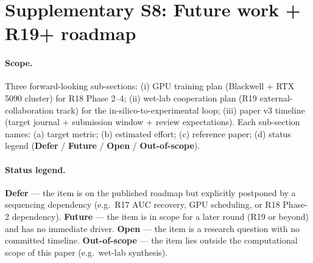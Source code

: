 %

\section*{Supplementary S8: Future work + R19+ roadmap}

\providecommand{\MEASURED}{\textbf{MEASURED}}
\providecommand{\PROJECTED}{\textbf{PROJECTED}}
\providecommand{\DESIGN}{\textbf{DESIGN}}
\providecommand{\CITEDONLY}{\textbf{CITED-ONLY}}

\paragraph{Scope.}
Three forward-looking sub-sections: (i) GPU training plan
(Blackwell + RTX 5090 cluster) for R18 Phase 2--4; (ii)
wet-lab cooperation plan (R19 external-collaboration track)
for the in-silico-to-experimental loop; (iii) paper v3
timeline (target journal + submission window + review
expectations).  Each sub-section names: (a) target metric;
(b) estimated effort; (c) reference paper; (d) status legend
(\textbf{Defer} / \textbf{Future} / \textbf{Open} /
\textbf{Out-of-scope}).

\paragraph{Status legend.}
\textbf{Defer} --- the item is on the published roadmap but
explicitly postponed by a sequencing dependency (e.g.\ R17
AUC recovery, GPU scheduling, or R18 Phase-2 dependency).
\textbf{Future} --- the item is in scope for a later round
(R19 or beyond) and has no immediate driver.
\textbf{Open} --- the item is a research question with no
committed timeline.  \textbf{Out-of-scope} --- the item lies
outside the computational scope of this paper (e.g.\
wet-lab synthesis).

